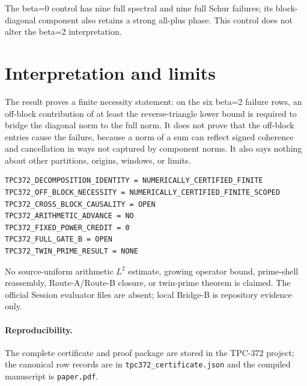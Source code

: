 \documentclass[10pt]{article}
\begin{document}
The beta=0 control has nine full spectral and nine full Schur failures; its
block-diagonal component also retains a strong all-plus phase.  This control
does not alter the beta=2 interpretation.

\section{Interpretation and limits}

The result proves a finite necessity statement: on the six beta=2 failure
rows, an off-block contribution of at least the reverse-triangle lower bound
is required to bridge the diagonal norm to the full norm.  It does not prove
that the off-block entries cause the failure, because a norm of a sum can
reflect signed coherence and cancellation in ways not captured by component
norms.  It also says nothing about other partitions, origins, windows, or
limits.

\begin{verbatim}
TPC372_DECOMPOSITION_IDENTITY = NUMERICALLY_CERTIFIED_FINITE
TPC372_OFF_BLOCK_NECESSITY = NUMERICALLY_CERTIFIED_FINITE_SCOPED
TPC372_CROSS_BLOCK_CAUSALITY = OPEN
TPC372_ARITHMETIC_ADVANCE = NO
TPC372_FIXED_POWER_CREDIT = 0
TPC372_FULL_GATE_B = OPEN
TPC372_TWIN_PRIME_RESULT = NONE
\end{verbatim}

No source-uniform arithmetic \(L^2\) estimate, growing operator bound,
prime-shell reassembly, Route-A/Route-B closure, or twin-prime theorem is
claimed.  The official Session evaluator files are absent; local Bridge-B is
repository evidence only.

\paragraph{Reproducibility.}
The complete certificate and proof package are stored in the TPC-372 project;
the canonical row records are in \texttt{tpc372\_certificate.json} and the
compiled manuscript is \texttt{paper.pdf}.
\end{document}
